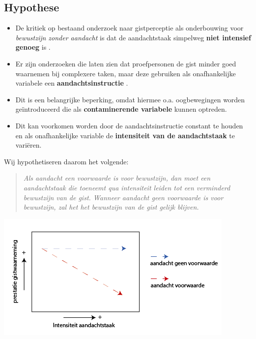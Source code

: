\documentclass[a0,portrait]{a0poster}
\begin{document}
\begin{multicols}{3}
\section*{Hypothese}
\begin{itemize}
\item De kritiek op bestaand onderzoek naar gistperceptie als onderbouwing voor \textit{bewustzijn zonder aandacht} is dat de aandachtstaak simpelweg \textbf{niet intensief genoeg} is \nocite{Cohen_Alvarez_Nakayama_2011, Mack_Clarke_2012}.
\item Er zijn onderzoeken die laten zien dat proefpersonen de gist minder goed waarnemen bij complexere taken, maar deze gebruiken als onafhankelijke variabele een \textbf{aandachtsinstructie} \cite{Mack_Clarke_2012}.
\item  Dit is een belangrijke beperking, omdat hiermee o.a. oogbewegingen worden ge\"introduceerd die als \textbf{contaminerende variabele} kunnen optreden. \nocite{moore2013clinically}
\item  Dit kan voorkomen worden door de aandachtsinstructie constant te houden en als onafhankelijke variable de \textbf{intensiteit van de aandachtstaak} te vari\"eren.
\end{itemize}
Wij hypothetiseren daarom het volgende:
\begin{quote}
\textit{Als aandacht een voorwaarde is voor bewustzijn, dan moet een aandachtstaak die toeneemt qua intensiteit leiden tot een verminderd bewustzijn van de gist. Wanneer aandacht geen voorwaarde is voor bewustzijn, zal het het bewustzijn van de gist gelijk blijven.}
\end{quote}
\begin{center}\vspace{1cm}
\includegraphics[width=1.0\linewidth]{illustratieHypothese.png}
\end{center}%

\end{multicols}
\end{document}
